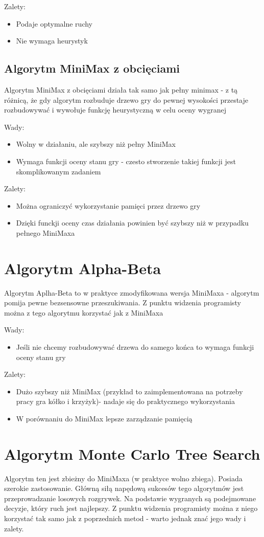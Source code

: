 \documentclass[declaration,shortabstract,inz]{iithesis}
\begin{document}
Zalety:
\begin{itemize}
  \item Podaje optymalne ruchy
  \item Nie wymaga heurystyk
\end{itemize}
\subsection{Algorytm MiniMax z obcięciami}
Algorytm MiniMax z obcięciami działa tak samo jak pełny minimax - z tą różnicą, że gdy algorytm rozbuduje drzewo gry do pewnej wysokości przestaje rozbudowywać i wywołuje funkcję heurystyczną w celu oceny wygranej

Wady:
\begin{itemize}
  \item Wolny w działaniu, ale szybszy niż pełny MiniMax
  \item Wymaga funkcji oceny stanu gry - czesto stworzenie takiej funkcji jest skomplikowanym zadaniem
\end{itemize}

Zalety:
\begin{itemize}
  \item Można ograniczyć wykorzystanie pamięci przez drzewo gry
  \item Dzięki funckji oceny czas działania powinien być szybszy niż w przypadku pełnego MiniMaxa
\end{itemize}
\section{Algorytm Alpha-Beta}
Algorytm Aplha-Beta to w praktyce zmodyfikowana wersja MiniMaxa - algorytm pomija pewne bezsensowne przeszukiwania.
Z punktu widzenia programisty można z tego algorytmu korzystać jak z MiniMaxa

Wady:
\begin{itemize}
  \item Jeśli nie chcemy rozbudowywać drzewa do samego końca to wymaga funkcji oceny stanu gry
\end{itemize}

Zalety:
\begin{itemize}
  \item Dużo szybszy niż MiniMax (przykład to zaimplementowana na potrzeby pracy gra kółko i krzyżyk)- nadaje się do praktycznego wykorzystania
  \item W porównaniu do MiniMax lepsze zarządzanie pamięcią
\end{itemize}
\section{Algorytm Monte Carlo Tree Search}
Algorytm ten jest zbieżny do MiniMaxa (w praktyce wolno zbiega). Posiada szerokie zastosowanie.
Główną siłą napędową sukcesów tego algorytmów jest przeprowadzanie losowych rozgrywek.
Na podstawie wygranych są podejmowane decyzje, który ruch jest najlepszy.
Z punktu widzenia programisty można z niego korzystać tak samo jak z poprzednich metod - warto jednak znać jego wady i zalety.
\end{document}
